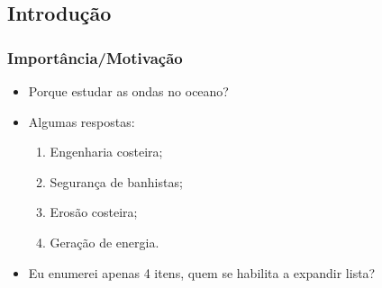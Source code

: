 \subsection{Introdução}
{%
\begin{frame}
    \frametitle{Importância/Motivação}
    \begin{itemize}[<+-| alert@+>]
        \item Porque estudar as ondas no oceano?
        \item Algumas respostas:
            \begin{enumerate}[<+-| alert@+>]
                \item[] Engenharia costeira;
                \item[] Segurança de banhistas;
                \item[] Erosão costeira;
                \item[] Geração de energia.
            \end{enumerate}
        \item Eu enumerei apenas 4 itens, quem se habilita a expandir lista?
    \end{itemize}
    \vspace*{5cm}
\end{frame}
}


